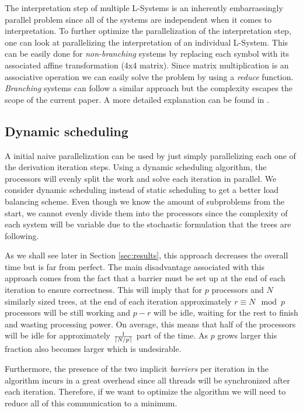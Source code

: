 \documentclass[letterpaper,twoside,11pt]{article}
\begin{document}
\begin{multicols}{2}
The interpretation step of multiple L-Systems is an inherently embarrassingly parallel problem since all of the systems are independent when it comes to interpretation. To further optimize the parallelization of the interpretation step, one can look at parallelizing the interpretation of an individual L-System. This can be easily done for \emph{non-branching} systems by replacing each symbol with its associated affine transformation (4x4 matrix). Since matrix multiplication is an associative operation we can easily solve the problem by using a \emph{reduce} function. \emph{Branching} systems can follow a similar approach but the complexity escapes the scope of the current paper. A more  detailed explanation can be found in \cite{LIPP-2010-PGMS}.

\subsection{Dynamic scheduling} %
\label{sub:dynamic_scheduling}


A initial naive parallelization can be used by just simply parallelizing each one of the derivation iteration steps. Using a dynamic scheduling algorithm, the processors will evenly split the work and solve each iteration in parallel. We consider dynamic scheduling instead of static scheduling to get a better load balancing scheme. Even though we know the amount of subproblems from the start, we cannot evenly divide them into the processors since the complexity of each system will be variable due to the  stochastic formulation that the trees are following.

 As we shall see later in Section \ref{sec:results}, this approach decreases the overall time but is far from perfect. The main disadvantage associated with this approach comes from the fact that a barrier must be set up at the end of each iteration to ensure correctness. This will imply that for $p$ processors and $N$ similarly sized trees, at the end of each iteration approximately $r \equiv N \mod p$ processors will be still working and $p - r$ will be idle, waiting for the rest to finish and wasting processing power. On average, this means that half of the processors will be idle for approximately $\frac{1}{\lceil N/p\rceil}$ part of the time. As $p$ grows larger this fraction also becomes larger which is undesirable.

Furthermore, the presence of the two implicit \emph{barriers} per iteration in the algorithm incurs in a great overhead since all threads will be synchronized after each iteration. Therefore, if we want to optimize the algorithm we will need to reduce all of this communication to a minimum.


\end{multicols}
\end{document}
